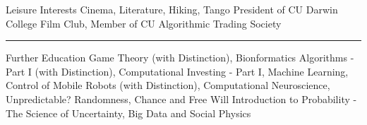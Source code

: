 \documentclass[12pt]{resume}
\begin{document}
\begin{category}{Leisure Interests}
\citemnobullet Cinema, Literature, Hiking, Tango
\citemnobullet President of CU Darwin College Film Club, Member of CU Algorithmic Trading Society %

\noindent\rule{\textwidth}{0.2pt}
\end{category}


\begin{category}{Further Education}
Game Theory (with Distinction),
Bionformatics Algorithms - Part I (with Distinction), Computational Investing - Part I,
Machine Learning, Control of Mobile Robots (with Distinction),
Computational Neuroscience, Unpredictable? Randomness, Chance and Free Will
Introduction to Probability - The Science of Uncertainty,
Big Data and Social Physics
\end{category}
\end{document}
